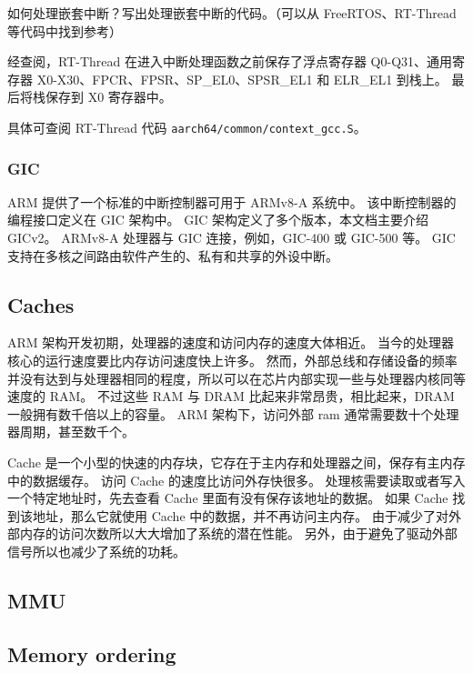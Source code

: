 \begin{probsolu}[title={Problem and Solution \theprob}]{
  如何处理嵌套中断？写出处理嵌套中断的代码。（可以从 FreeRTOS、RT-Thread 等代码中找到参考）
  }\label{pb:how-to-hdl-nest-irqs}

  经查阅，RT-Thread 在进入中断处理函数之前保存了浮点寄存器 Q0-Q31、通用寄存器 X0-X30、FPCR、FPSR、SP\_EL0、SPSR\_EL1 和 ELR\_EL1 到栈上。
  最后将栈保存到 X0 寄存器中。

  具体可查阅 RT-Thread 代码 \lstinline!aarch64/common/context_gcc.S!。
\end{probsolu}

\subsubsection{GIC}

ARM 提供了一个标准的中断控制器可用于 ARMv8-A 系统中。
该中断控制器的编程接口定义在 GIC 架构中。
GIC 架构定义了多个版本，本文档主要介绍 GICv2。
ARMv8-A 处理器与 GIC 连接，例如，GIC-400 或 GIC-500 等。
GIC 支持在多核之间路由软件产生的、私有和共享的外设中断。

\subsection{Caches}

ARM 架构开发初期，处理器的速度和访问内存的速度大体相近。
当今的处理器核心的运行速度要比内存访问速度快上许多。
然而，外部总线和存储设备的频率并没有达到与处理器相同的程度，所以可以在芯片内部实现一些与处理器内核同等速度的 RAM。
不过这些 RAM 与 DRAM 比起来非常昂贵，相比起来，DRAM 一般拥有数千倍以上的容量。
ARM 架构下，访问外部 ram 通常需要数十个处理器周期，甚至数千个。

Cache 是一个小型的快速的内存块，它存在于主内存和处理器之间，保存有主内存中的数据缓存。 
访问 Cache 的速度比访问外存快很多。
处理核需要读取或者写入一个特定地址时，先去查看 Cache 里面有没有保存该地址的数据。
如果 Cache 找到该地址，那么它就使用 Cache 中的数据，并不再访问主内存。
由于减少了对外部内存的访问次数所以大大增加了系统的潜在性能。
另外，由于避免了驱动外部信号所以也减少了系统的功耗。

\subsection{MMU}

\subsection{Memory ordering} \label{sec:memory-ordering}

